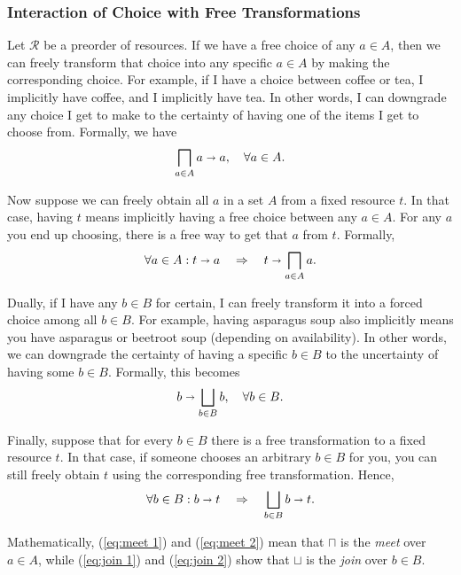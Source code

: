 \documentclass[12pt]{article}
\theoremstyle{definition}
\theoremstyle{plain}
\theoremstyle{plain}
\theoremstyle{plain}
\theoremstyle{plain}
\theoremstyle{remark}
\theoremstyle{remark}
\newcommand{\mc}[1]{\mathcal{#1}}
\begin{document}
\subsubsection{Interaction of Choice with Free Transformations}\label{sec:intr free}
Let $\mc{R}$ be a preorder of resources. If we have a free choice of any $a \in A$, then we can freely transform that choice into any specific $a \in A$ by making the corresponding choice. For example, if I have a choice between coffee or tea, I implicitly have coffee, and I implicitly have tea. In other words, I can downgrade any choice I get to make to the certainty of having one of the items I get to choose from. Formally, we have 
\begin{equation}\label{eq:meet 1}
	\bigsqcap_{a \in A} a \shortrightarrow a, \quad \forall a \in A.
\end{equation}

Now suppose we can freely obtain all $a$ in a set $A$ from a fixed resource $t$. In that case, having $t$ means implicitly having a free choice between any $a \in A$. For any $a$ you end up choosing, there is a free way to get that $a$ from $t$. Formally,
\begin{equation}\label{eq:meet 2}
	\forall a \in A : t \shortrightarrow a  \quad \Rightarrow \quad t \shortrightarrow 	\bigsqcap_{a \in A} a.
\end{equation}

Dually, if I have any $b \in B$ for certain, I can freely transform it into a forced choice among all $b \in B$. For example, having asparagus soup also implicitly means you have asparagus or beetroot soup (depending on availability). In other words, we can downgrade the certainty of having a specific $b \in B$ to the uncertainty of having some $b \in B$. Formally, this becomes
\begin{equation}\label{eq:join 1}
b \shortrightarrow \bigsqcup_{b \in B} b, \quad \forall b \in B.
\end{equation}

Finally, suppose that for every $b \in B$ there is a free transformation to a fixed resource $t$. In that case, if someone chooses an arbitrary $b \in B$ for you, you can still freely obtain $t$ using the corresponding free transformation. Hence,
\begin{equation}\label{eq:join 2}
\forall b \in B : b \shortrightarrow t  \quad \Rightarrow \quad  \bigsqcup_{b \in B} b \shortrightarrow t.
\end{equation}


Mathematically, (\ref{eq:meet 1}) and (\ref{eq:meet 2}) mean that $\sqcap$ is the \emph{meet} over $a \in A$, while (\ref{eq:join 1}) and (\ref{eq:join 2}) show that $\sqcup$ is the \emph{join} over $b \in B$.
\end{document}
